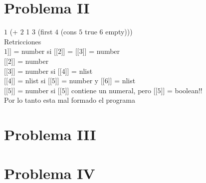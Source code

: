 \documentclass[12pt]{article}
\begin{document}
\section*{Problema II}
$\boxed{1}$ (+ $\boxed{2}$ 1 $\boxed{3}$ (first $\boxed{4}$ (cons $\boxed{5}$ true $\boxed{6}$ empty))) \\


\noindent Retricciones \\

\noindent{[[}$\boxed{1}${]]} = number si {[[}$\boxed{2}${]]} = {[[}$\boxed{3}${]]} = number \\
{[[}$\boxed{2}${]]} = number \\
{[[}$\boxed{3}${]]} = number si [[$\boxed{4}$]] = nlist \\
{[[}$\boxed{4}${]]} = nlist si [[$\boxed{5}$]] = number y [[$\boxed{6}$]] = nlist \\
{[[}$\boxed{5}${]]} = number si [[$\boxed{5}$]] contiene un numeral, pero [[$\boxed{5}$]] = boolean!! \\
Por lo tanto esta mal formado el programa

\section*{Problema III}
\section*{Problema IV}
\end{document}
